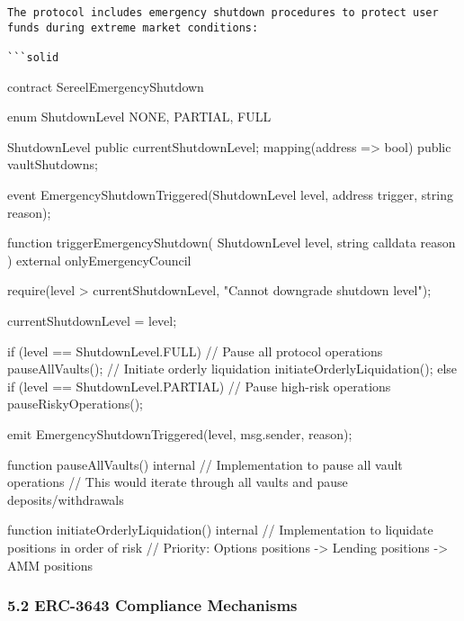 \documentclass[12pt]{article}
\begin{document}
\begin{lstlisting}
The protocol includes emergency shutdown procedures to protect user funds during extreme market conditions:

```solid
\end{lstlisting}
contract SereelEmergencyShutdown {    enum ShutdownLevel {        NONE,        PARTIAL,        FULL    }

    ShutdownLevel public currentShutdownLevel;    mapping(address => bool) public vaultShutdowns;

    event EmergencyShutdownTriggered(ShutdownLevel level, address trigger, string reason);

    function triggerEmergencyShutdown(        ShutdownLevel level,        string calldata reason    ) external onlyEmergencyCouncil {        require(level > currentShutdownLevel, "Cannot downgrade shutdown level");

        currentShutdownLevel = level;

        if (level == ShutdownLevel.FULL) {            // Pause all protocol operations            pauseAllVaults();            // Initiate orderly liquidation            initiateOrderlyLiquidation();        } else if (level == ShutdownLevel.PARTIAL) {            // Pause high-risk operations            pauseRiskyOperations();        }

        emit EmergencyShutdownTriggered(level, msg.sender, reason);    }

    function pauseAllVaults() internal {        // Implementation to pause all vault operations        // This would iterate through all vaults and pause deposits/withdrawals    }

    function initiateOrderlyLiquidation() internal {        // Implementation to liquidate positions in order of risk        // Priority: Options positions -> Lending positions -> AMM positions    }}
\subsubsection{5.2 ERC-3643 Compliance Mechanisms} %
\end{document}
